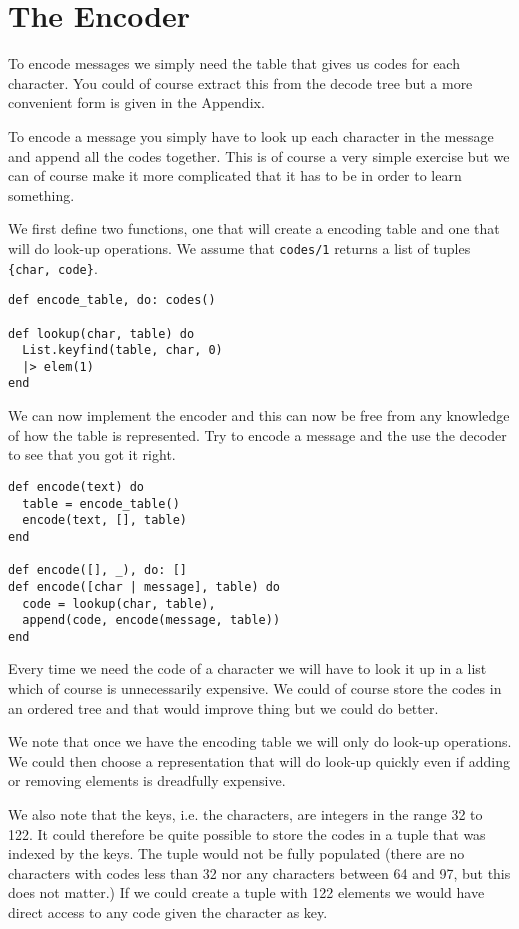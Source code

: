 \documentclass[a4paper,11pt]{article}
\begin{document}
\section{The Encoder}

To encode messages we simply need the table that gives us codes for
each character. You could of course extract this from the decode tree
but a more convenient form is given in the Appendix. 

To encode a message you simply have to look up each character in the
message and append all the codes together. This is of course a very
simple exercise but we can of course make it more complicated that it
has to be in order to learn something.

We first define two functions, one that will create a encoding table
and one that will do look-up operations. We assume that {\tt codes/1}
returns a list of tuples {\tt\{char, code\}}.

\begin{verbatim}
def encode_table, do: codes()

def lookup(char, table) do
  List.keyfind(table, char, 0)
  |> elem(1)
end
\end{verbatim}


We can now implement the encoder and this can now be free from any
knowledge of how the table is represented. Try to encode a message and
the use the decoder to see that you got it right.

\begin{verbatim}
def encode(text) do
  table = encode_table()
  encode(text, [], table)
end

def encode([], _), do: []
def encode([char | message], table) do 
  code = lookup(char, table),
  append(code, encode(message, table))
end
\end{verbatim}

Every time we need the code of a character we will have
to look it up in a list which of course is unnecessarily expensive.  We
could of course store the codes in an ordered tree and that would
improve thing but we could do better.

We note that once we have the encoding table we will only do look-up
operations. We could then choose a representation that will do look-up
quickly even if adding or removing elements is dreadfully expensive.

We also note that the keys, i.e. the characters, are integers in the
range 32 to 122. It could therefore be quite possible to store the
codes in a tuple that was indexed by the keys. The tuple would not be
fully populated (there are no characters with codes less than 32 nor
any characters between 64 and 97, but this does not matter.) If we
could create a tuple with 122 elements we would have direct access to
any code given the character as key.
\end{document}
